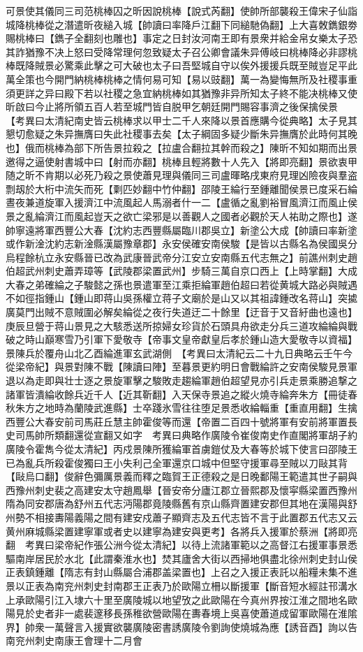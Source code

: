 可景使其儀同三司范桃棒囚之昕因說桃棒【說式芮翻】使帥所部襲殺王偉宋子仙詣城降桃棒從之潛遣昕夜縋入城【帥讀曰率降戶江翻下同縋馳偽翻】上大喜敇鐫銀劵賜桃棒曰【鐫子全翻刻也雕也】事定之日封汝河南王即有景衆并給金帛女樂太子恐其詐猶豫不决上怒曰受降常理何忽致疑太子召公卿會議朱异傅岐曰桃棒降必非謬桃棒既降賊景必驚乘此擊之可大破也太子曰吾堅城自守以俟外援援兵既至賊豈足平此萬全策也今開門納桃棒桃棒之情何易可知【易以豉翻】萬一為變悔無所及社稷事重須更詳之异曰殿下若以社稷之急宜納桃棒如其猶豫非异所知太子終不能决桃棒又使昕啟曰今止將所領五百人若至城門皆自脱甲乞朝廷開門賜容事濟之後保擒侯景　【考異曰太清紀南史皆云桃棒求以甲士二千人來降以景首應購今從典略】太子見其懇切愈疑之朱异撫膺曰失此社稷事去矣【太子綱固多疑少斷朱异撫膺於此時何其晚也】俄而桃棒為部下所告景拉殺之【拉盧合翻拉其幹而殺之】陳昕不知如期而出景邀得之逼使射書城中曰【射而亦翻】桃棒且輕將數十人先入【將即亮翻】景欲衷甲随之昕不肯期以必死乃殺之景使蕭見理與儀同三司盧暉略戌東府見理凶險夜與羣盗剽刼於大桁中流矢而死【㔄匹妙翻中竹仲翻】邵陵王綸行至鍾離聞侯景已度采石綸晝夜兼道旋軍入援濟江中流風起人馬溺者什一二【盧循之亂劉裕冒風濟江而風止侯景之亂綸濟江而風起豈天之欲亡梁邪是以善觀人之國者必觀於天人祐助之際也】遂帥寧遠將軍西豐公大春【沈約志西豐縣屬臨川郡吳立】新塗公大成【帥讀曰率新塗或作新淦沈約志新淦縣漢屬豫章郡】永安侯確安南侯駿【是皆以古縣名為侯國吳分烏程餘杭立永安縣晉已改為武康晉武帝分江安立安南縣五代志無之】前譙州刺史趙伯超武州刺史蕭弄璋等【武陵郡梁置武州】步騎三萬自京口西上【上時掌翻】大成大春之弟確綸之子駿懿之孫也景遣軍至江乘拒綸軍趙伯超曰若從黄城大路必與賊遇不如徑指鍾山【鍾山即蒋山吳孫權立蒋子文廟於是山又以其祖諱鍾改名蒋山】突㨿廣莫門出賊不意賊圍必解矣綸從之夜行失道迂二十餘里【迂音于又音紆曲也遠也】庚辰旦營于蒋山景見之大駭悉送所掠婦女珍貨於石頭具舟欲走分兵三道攻綸綸與戰破之時山巔寒雪乃引軍下愛敬寺【帝事文皇帝獻皇后孝於鍾山造大愛敬寺以資福】景陳兵於覆舟山北乙酉綸進軍玄武湖側　【考異曰太清紀云二十九日典略云壬午今從梁帝紀】與景對陳不戰【陳讀曰陣】至暮景更約明日會戰綸許之安南侯駿見景軍退以為走即與壮士逐之景旋軍擊之駿敗走趨綸軍趙伯超望見亦引兵走景乘勝追撃之諸軍皆潰綸收餘兵近千人【近其靳翻】入天保寺景追之縱火燒寺綸奔朱方【冊徒春秋朱方之地時為蘭陵武進縣】士卒踐氷雪往往堕足景悉收綸輜重【重直用翻】生擒西豐公大春安前司馬莊丘慧主帥霍俊等而還【帝置二百四十號將軍有安前將軍置長史司馬帥所類翻還從宣翻又如字　考異曰典略作廣陵令崔俊南史作直閣將軍胡子約廣陵令霍雋今從太清紀】丙戍景陳所獲綸軍首虜鎧仗及大春等於城下使言曰邵陵王已為亂兵所殺霍俊獨曰王小失利己全軍還京口城中但堅守援軍尋至賊以刀敺其背【敺烏口翻】俊辭色彌厲景義而釋之臨賀王正德殺之是日晚鄱陽王範遣其世子嗣與西豫州刺史裴之高建安太守趙鳳舉【晉安帝分廬江郡立晉熙郡及懷寜縣梁置西豫州隋為同安郡唐為舒州五代志沔陽郡竟陵縣舊有京山縣齊置建安郡但其地在漢陽與舒州勢不相接夀陽義陽之間有建安戍蕭子顯齊志及五代志皆不言于此置郡五代志又云黄州麻城縣梁置建寧軍或者史以建寧為建安與更考】各將兵入援軍於蔡洲【將即亮翻　考異曰梁帝紀作張公洲今從太清紀】以待上流諸軍範以之高督江右援軍事景悉驅南岸居民於水北【此謂秦淮水也】焚其廬舍大街以西掃地俱盡北徐州刺史封山侯正表鎮鍾離【隋志有封山縣屬合浦郡盖梁置也】上召之入援正表託以船糧未集不進景以正表為南兖州刺史封南郡王正表乃於歐陽立柵以斷援軍【斷音短水經註邗溝水上承歐陽引江入埭六十里至廣陵城以地望攷之此歐陽在今真州界按江淮之間地名歐陽見於史者非一處裴邃移長孫稚欲營歐陽在夀春境上吳喜使蕭道成留軍歐陽在淮隂界】帥衆一萬聲言入援實欲襲廣陵密書誘廣陵令劉詢使燒城為應【誘音酉】詢以告南兖州刺史南康王會理十二月會